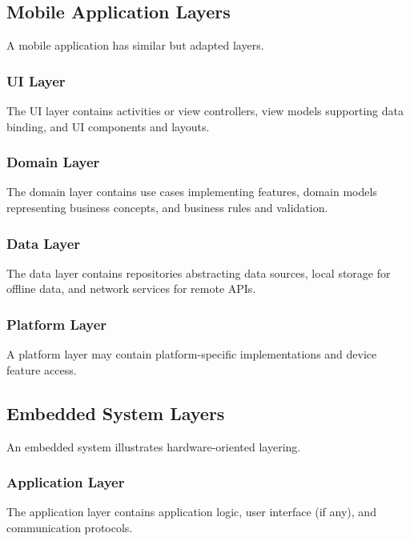 \documentclass[11pt]{article}
\begin{document}
\subsection{Mobile Application Layers}

A mobile application has similar but adapted layers.

\subsubsection{UI Layer}

The UI layer contains activities or view controllers, view models supporting data binding, and UI components and layouts.

\subsubsection{Domain Layer}

The domain layer contains use cases implementing features, domain models representing business concepts, and business rules and validation.

\subsubsection{Data Layer}

The data layer contains repositories abstracting data sources, local storage for offline data, and network services for remote APIs.

\subsubsection{Platform Layer}

A platform layer may contain platform-specific implementations and device feature access.

\subsection{Embedded System Layers}

An embedded system illustrates hardware-oriented layering.

\subsubsection{Application Layer}

The application layer contains application logic, user interface (if any), and communication protocols.
\end{document}
